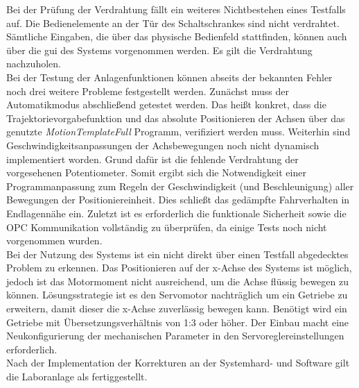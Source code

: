 \documentclass[../../../Bachelorarbeit.tex]{subfiles}
\begin{document}
Bei der Prüfung der Verdrahtung fällt ein weiteres Nichtbestehen eines Testfalls auf. Die Bedienelemente an der Tür des Schaltschrankes sind nicht verdrahtet. Sämtliche Eingaben, die über das physische Bedienfeld stattfinden, können auch über die \acs{gui} des Systems vorgenommen werden. Es gilt die Verdrahtung nachzuholen.\\
Bei der Testung der Anlagenfunktionen können abseits der bekannten Fehler noch drei weitere Probleme festgestellt werden. Zunächst muss der Automatikmodus abschließend getestet werden. Das heißt konkret, dass die Trajektorievorgabefunktion und das absolute Positionieren der Achsen über das genutzte \textit{MotionTemplateFull} Programm, verifiziert werden muss. Weiterhin sind Geschwindigkeitsanpassungen der Achsbewegungen noch nicht dynamisch implementiert worden. Grund dafür ist die fehlende Verdrahtung der vorgesehenen Potentiometer. Somit ergibt sich die Notwendigkeit einer Programmanpassung zum Regeln der Geschwindigkeit (und Beschleunigung) aller Bewegungen der Positioniereinheit. Dies schließt das gedämpfte Fahrverhalten in Endlagennähe ein. Zuletzt ist es erforderlich die funktionale Sicherheit sowie die OPC Kommunikation vollständig zu überprüfen, da einige Tests noch nicht vorgenommen wurden.\\
Bei der Nutzung des Systems ist ein nicht direkt über einen Testfall abgedecktes Problem zu erkennen. Das Positionieren auf der x-Achse des Systems ist möglich, jedoch ist das Motormoment nicht ausreichend, um die Achse flüssig bewegen zu können. Lösungsstrategie ist es den Servomotor nachträglich um ein Getriebe zu erweitern, damit dieser die x-Achse zuverlässig bewegen kann. Benötigt wird ein Getriebe mit Übersetzungsverhältnis von 1:3 oder höher. Der Einbau macht eine Neukonfigurierung der mechanischen Parameter in den Servoreglereinstellungen erforderlich.\\
\bigskip \newline
Nach der Implementation der Korrekturen an der Systemhard- und Software gilt die Laboranlage als fertiggestellt. 
\end{document}
